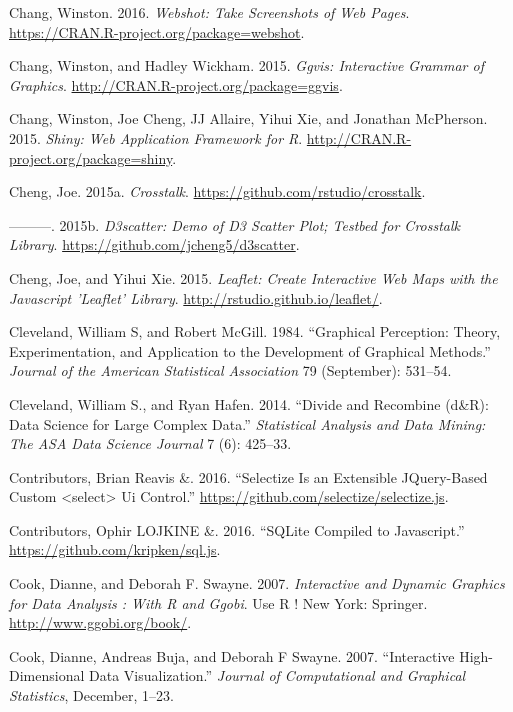 \documentclass[12pt,]{isuthesis}
\begin{document}
\hypertarget{ref-webshot}{}
Chang, Winston. 2016. \emph{Webshot: Take Screenshots of Web Pages}.
\url{https://CRAN.R-project.org/package=webshot}.

\hypertarget{ref-ggvis}{}
Chang, Winston, and Hadley Wickham. 2015. \emph{Ggvis: Interactive
Grammar of Graphics}. \url{http://CRAN.R-project.org/package=ggvis}.

\hypertarget{ref-shiny}{}
Chang, Winston, Joe Cheng, JJ Allaire, Yihui Xie, and Jonathan
McPherson. 2015. \emph{Shiny: Web Application Framework for R}.
\url{http://CRAN.R-project.org/package=shiny}.

\hypertarget{ref-crosstalk}{}
Cheng, Joe. 2015a. \emph{Crosstalk}.
\url{https://github.com/rstudio/crosstalk}.

\hypertarget{ref-d3scatter}{}
---------. 2015b. \emph{D3scatter: Demo of D3 Scatter Plot; Testbed for
Crosstalk Library}. \url{https://github.com/jcheng5/d3scatter}.

\hypertarget{ref-leaflet}{}
Cheng, Joe, and Yihui Xie. 2015. \emph{Leaflet: Create Interactive Web
Maps with the Javascript 'Leaflet' Library}.
\url{http://rstudio.github.io/leaflet/}.

\hypertarget{ref-graphical-perception}{}
Cleveland, William S, and Robert McGill. 1984. ``Graphical Perception:
Theory, Experimentation, and Application to the Development of Graphical
Methods.'' \emph{Journal of the American Statistical Association} 79
(September): 531--54.

\hypertarget{ref-divide-recombine}{}
Cleveland, William S., and Ryan Hafen. 2014. ``Divide and Recombine
(d\&R): Data Science for Large Complex Data.'' \emph{Statistical
Analysis and Data Mining: The ASA Data Science Journal} 7 (6): 425--33.

\hypertarget{ref-selectizejs}{}
Contributors, Brian Reavis \&. 2016. ``Selectize Is an Extensible
JQuery-Based Custom \textless{}select\textgreater{} Ui Control.''
\url{https://github.com/selectize/selectize.js}.

\hypertarget{ref-SQLjs}{}
Contributors, Ophir LOJKINE \&. 2016. ``SQLite Compiled to Javascript.''
\url{https://github.com/kripken/sql.js}.

\hypertarget{ref-ggobi:2007}{}
Cook, Dianne, and Deborah F. Swayne. 2007. \emph{Interactive and Dynamic
Graphics for Data Analysis : With R and Ggobi}. Use R ! New York:
Springer. \url{http://www.ggobi.org/book/}.

\hypertarget{ref-Cook:2007uk}{}
Cook, Dianne, Andreas Buja, and Deborah F Swayne. 2007. ``Interactive
High-Dimensional Data Visualization.'' \emph{Journal of Computational
and Graphical Statistics}, December, 1--23.
\end{document}
